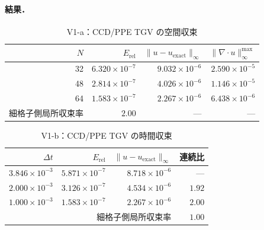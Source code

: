 \paragraph{結果．}
\begin{table}[!ht]
\caption{V1-a：CCD/PPE TGV の空間収束}
\label{tab:V1_spatial}
\centering\small
\begin{tabular}{r r r r}
\toprule
$N$ & $E_{\mathrm{rel}}$ & $\|u-u_{\mathrm{exact}}\|_\infty$ & $\|\nabla\!\cdot u\|_\infty^{\max}$ \\
\midrule
32 & $6.320\times 10^{-7}$ & $9.032\times 10^{-6}$ & $2.590\times 10^{-5}$ \\
48 & $2.814\times 10^{-7}$ & $4.026\times 10^{-6}$ & $1.146\times 10^{-5}$ \\
64 & $1.583\times 10^{-7}$ & $2.267\times 10^{-6}$ & $6.438\times 10^{-6}$ \\
\midrule
細格子側局所収束率 & $\mathbf{2.00}$ & --- & --- \\
\bottomrule
\end{tabular}
\end{table}

\begin{table}[!ht]
\caption{V1-b：CCD/PPE TGV の時間収束}
\label{tab:V1_temporal}
\centering\small
\begin{tabular}{r r r r}
\toprule
$\Delta t$ & $E_{\mathrm{rel}}$ & $\|u-u_{\mathrm{exact}}\|_\infty$ & 連続比 \\
\midrule
$3.846\times 10^{-3}$ & $5.871\times 10^{-7}$ & $8.718\times 10^{-6}$ & --- \\
$2.000\times 10^{-3}$ & $3.126\times 10^{-7}$ & $4.534\times 10^{-6}$ & $1.92$ \\
$1.000\times 10^{-3}$ & $1.583\times 10^{-7}$ & $2.267\times 10^{-6}$ & $2.00$ \\
\midrule
\multicolumn{3}{r}{細格子側局所収束率} & $\mathbf{1.00}$ \\
\bottomrule
\end{tabular}
\end{table}

